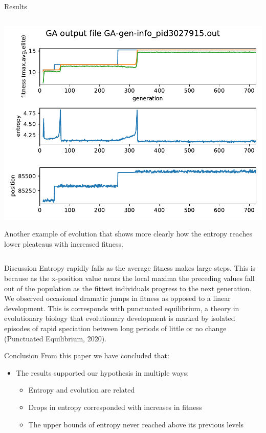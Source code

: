 \documentclass[10pt,aspectratio=169]{beamer}
\begin{document}
\begin{frame}{Results}
\begin{columns}
    \begin{column}{0.6\textwidth}
     \includegraphics[width=\textwidth]{GA-gen-info_pid3027915.out.pdf}\\ {\tiny
      				\begin{singlespace}
      				Another example of evolution that shows more clearly how
      				the entropy reaches lower pleateaus with increased fitness.
      				\end{singlespace}	
      		}
    \end{column}
  \end{columns}
\end{frame}

\begin{frame}{Discussion}
	Entropy rapidly falls as the average fitness makes large steps. This
	is because as the x-position value nears the local maxima the
	preceding values fall out of the population as the fittest individuals
	progress to the next generation. We observed occasional dramatic jumps
	in fitness as opposed to a linear development. This is corresponds
	with punctuated equilibrium, a theory in evolutionary biology that
	evolutionary development is marked by isolated episodes of rapid
	speciation between long periods of little or no change (Punctuated
	Equilibrium, 2020).
\end{frame}

\begin{frame}{Conclusion}
	From this paper we have concluded that:
	\begin{itemize}
		\item The results supported our hypothesis in multiple ways:
			\begin{itemize}
				\item Entropy and evolution are related
				\item Drops in entropy corresponded with increases in fitness
				\item The upper bounds of entropy never reached above its previous levels
			\end{itemize}
		
	\end{itemize}

\end{frame}
\end{document}
